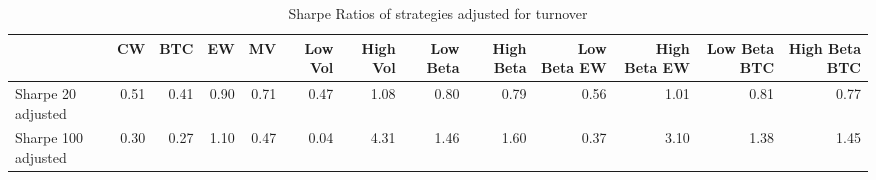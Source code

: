 \begin{table}
\centering
\caption{Sharpe Ratios of strategies adjusted for turnover}
\label{sharpe}
\begin{tabular}{lrrrrrrrrrrrr}
\toprule
{} &   CW &  BTC &   EW &   MV &  Low Vol &  High Vol &  Low Beta &  High Beta &  Low Beta EW &  High Beta EW &  Low Beta BTC &  High Beta BTC \\
\midrule
Sharpe 20 adjusted  & 0.51 & 0.41 & 0.90 & 0.71 &     0.47 &      1.08 &      0.80 &       0.79 &         0.56 &          1.01 &          0.81 &           0.77 \\
Sharpe 100 adjusted & 0.30 & 0.27 & 1.10 & 0.47 &     0.04 &      4.31 &      1.46 &       1.60 &         0.37 &          3.10 &          1.38 &           1.45 \\
\bottomrule
\end{tabular}
\end{table}
